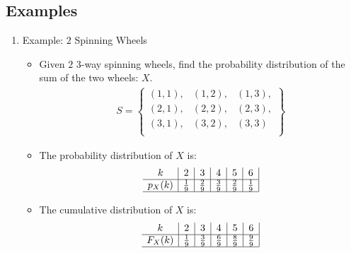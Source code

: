 \documentclass[12pt]{article}
\begin{document}
        \subsection{Examples}
            \begin{enumerate}
                \item Example: $2$ Spinning Wheels
                \begin{itemize}
                    \item Given $2$ $3$-way spinning wheels, find the probability distribution of the sum of the two wheels: $X$.
                    \begin{align*}
                        S = \begin{Bmatrix}
                            (1, 1), & (1, 2), & (1, 3), \\
                            (2, 1), & (2, 2), & (2, 3), \\
                            (3, 1), & (3, 2), & (3, 3)\  \\
                        \end{Bmatrix}
                    \end{align*}
                    \item The probability distribution of $X$ is:
                    \begin{align*}
                        \begin{array}{c|c|c|c|c|c|c|c|c|c}
                            k & 2 & 3 & 4 & 5 & 6 \\
                            \hline
                            p_X(k) & \frac{1}{9} & \frac{2}{9} & \frac{3}{9} & \frac{2}{9} & \frac{1}{9} \\
                            \hline
                        \end{array}
                    \end{align*}
                    \item The cumulative distribution of $X$ is:
                    \begin{align*}
                        \begin{array}{c|c|c|c|c|c|c|c|c|c}
                            k & 2 & 3 & 4 & 5 & 6 \\
                            \hline
                            F_X(k) & \frac{1}{9} & \frac{3}{9} & \frac{6}{9} & \frac{8}{9} & \frac{9}{9} \\
                            \hline
                        \end{array}

\end{align*}
\end{itemize}
\end{enumerate}
\end{document}
